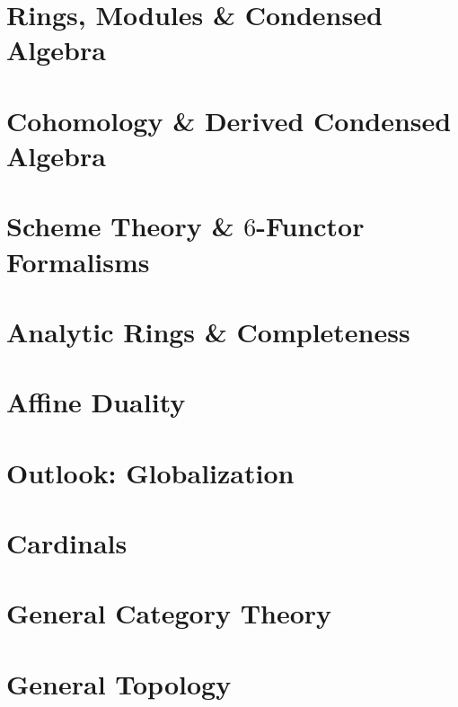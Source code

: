 \documentclass[a4paper, 12pt]{scrreport}  %
\begin{document}
	\chapter{Rings, Modules \& Condensed Algebra}
	\label{chapter: rings, modules and condensed algebra}
	
	

	\chapter{Cohomology \& Derived Condensed Algebra}
	\label{chapter: cohomology and derived condensed algebra}
	

	\chapter{Scheme Theory \& \texorpdfstring{$6$}{6}-Functor Formalisms}
	\label{chapter: scheme theory and $6$-functor formalisms}
	

	\chapter{Analytic Rings \& Completeness}
	\label{chapter: analytic rings and completeness}
	
	
	
	
	\chapter{Affine Duality}
	\label{chapter: affine duality}
	

	\chapter{Outlook: Globalization}
	\label{chapter: globalization}
	
	
	\appendix

	\chapter{Cardinals}
	\label{chapter: cardinals}
	

	\chapter{General Category Theory}
	\label{Section: General Category Theory}
	
	
	\chapter{General Topology}
	\label{chapter: general topology}
	
	
	
	
	
\end{document}
